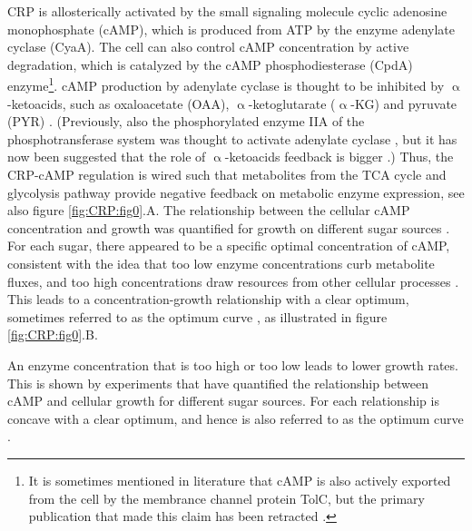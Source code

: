 CRP is allosterically activated by the small signaling molecule cyclic adenosine monophosphate (cAMP), 
which is produced from ATP by the enzyme adenylate cyclase (CyaA).
%
The cell can also control cAMP concentration by active degradation, 
which is catalyzed by the 
cAMP phosphodiesterase (CpdA) enzyme\footnote{It is sometimes mentioned in literature that cAMP is also actively exported from the cell by the membrance channel protein TolC, but the primary publication that made this claim has been retracted \cite{Hantke2011}.}.
%
cAMP production by adenylate cyclase is thought to be inhibited by $\upalpha$-ketoacids, such as oxaloacetate (OAA), $\upalpha$-ketoglutarate ($\upalpha$-KG) and pyruvate (PYR) \cite{You2013}.
(Previously, also the phosphorylated enzyme IIA of the phosphotransferase system was thought to activate adenylate cyclase \cite{Keseler2017, Deutscher2008, Gorke2008}, but it has now been suggested that the role of $\upalpha$-ketoacids feedback is bigger \cite{You2013}.)
%
Thus, the CRP-cAMP regulation is wired such that metabolites from the TCA cycle and glycolysis pathway provide negative feedback on metabolic enzyme expression, see also figure \ref{fig:CRP:fig0}.A. 
%
The relationship between the cellular cAMP concentration and growth was quantified for growth on different sugar sources \cite{Towbin2017}.
%
For each sugar, there appeared to be a specific optimal concentration of cAMP, consistent with the idea that
%
too low enzyme concentrations curb metabolite fluxes, and too high concentrations draw resources from other cellular processes 
\cite{Jensen1993, Dekel2005, Berkhout2013, Ray2016, Towbin2017, You2013}.
%
This leads to a concentration-growth relationship with a clear optimum, sometimes referred to as the optimum curve \cite{Towbin2017}, as illustrated in figure \ref{fig:CRP:fig0}.B.






An enzyme concentration that is too high or too low leads to lower growth rates.
This is shown by experiments that have quantified 
the relationship between cAMP and cellular growth for different sugar sources. 
For each  relationship is concave with a clear optimum, and hence is also referred to as the optimum curve \cite{Towbin2017}.

